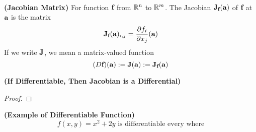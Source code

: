 \documentclass{report}
\begin{document}
\\

\begin{definition}
\label{4.2.5}
\textbf{(Jacobian Matrix)} For function $\textbf{f}$ from $\mathbb{R}^n$ to $\mathbb{R}^m$. The Jacobian $\textbf{J}_{\textbf{f}}(\textbf{a})$ of $\textbf{f}$ at $\textbf{a}$ is the matrix
 \begin{equation}
   \textbf{J}_{\textbf{f}}(\textbf{a})_{i,j}=\frac{\partial f_i}{\partial x_j}(\textbf{a})
\end{equation}
If we write $\textbf{J}$, we mean a matrix-valued function 
\begin{equation}
  (D\textbf{f})(\textbf{a}):=\textbf{J}(\textbf{a}):=\textbf{J}_{\textbf{f}}(\textbf{a})
\end{equation}
\end{definition}
\begin{theorem}
\label{4.2.6}
\textbf{(If Differentiable, Then Jacobian is a Differential)}
\end{theorem}
\begin{proof}
\end{proof}
\begin{theorem}
\label{4.2.7}
\textbf{(Example of Differentiable Function)} 
\begin{equation}
f(x,y)=x^2+2y\text{ is differentiable every where}
\end{equation}
\end{theorem}
\end{document}
